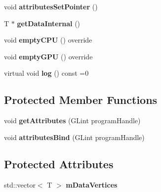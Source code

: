 \begin{DoxyCompactItemize}
\item 
\mbox{\label{classflw_1_1flc_1_1TVertexBuffer_aec3905d333ee85b9ba835ce8f16a8983}} 
void {\bfseries attributes\+Set\+Pointer} ()
\item 
\mbox{\label{classflw_1_1flc_1_1TVertexBuffer_af626b99a034e30125467ffc257c9d549}} 
T $\ast$ {\bfseries get\+Data\+Internal} ()
\item 
\mbox{\label{classflw_1_1flc_1_1TVertexBuffer_ad6ea1e0a7762f0cb345dc101ad0cba2a}} 
void {\bfseries empty\+C\+PU} () override
\item 
\mbox{\label{classflw_1_1flc_1_1TVertexBuffer_ab9fdab1ac2a39e0ae297bfb241ba3bc3}} 
void {\bfseries empty\+G\+PU} () override
\item 
\mbox{\label{classflw_1_1flc_1_1TVertexBuffer_a39e0298b5e8fa89111f666653e93d80a}} 
virtual void {\bfseries log} () const =0
\end{DoxyCompactItemize}
\subsection*{Protected Member Functions}
\begin{DoxyCompactItemize}
\item 
\mbox{\label{classflw_1_1flc_1_1TVertexBuffer_a56620ad26640704fd46a5f59a69ea674}} 
void {\bfseries get\+Attributes} (G\+Lint program\+Handle)
\item 
\mbox{\label{classflw_1_1flc_1_1TVertexBuffer_a8ca8c56c8818afe5270b7fdd8f56015f}} 
void {\bfseries attributes\+Bind} (G\+Lint program\+Handle)
\end{DoxyCompactItemize}
\subsection*{Protected Attributes}
\begin{DoxyCompactItemize}
\item 
\mbox{\label{classflw_1_1flc_1_1TVertexBuffer_a659e673f6f1efe77a500a5a4819cdc16}} 
std\+::vector$<$ T $>$ {\bfseries m\+Data\+Vertices}
\end{DoxyCompactItemize}


